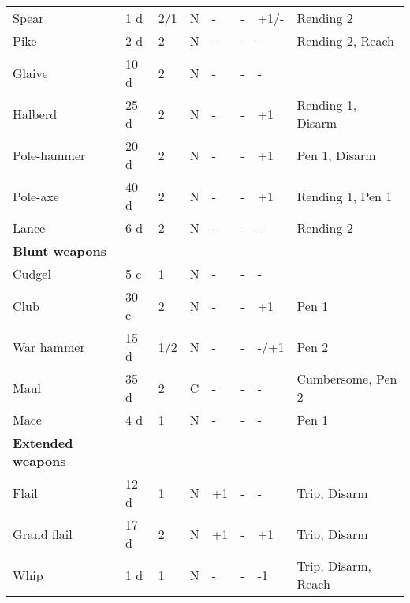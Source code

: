 \documentclass[a4paper,11pt,oneside]{book}
\newcommand{\textlf}[1]{\textbf{\titlecap{#1}}}
\begin{document}
\begin{table}[ht!]
\begin{tabular}{|l|l|l|l|l|l|l|l|}
		Spear & 1 d & 2/1 & N & - & - & +1/- & Rending 2 \\
		Pike & 2 d & 2 & N & - & - & - & Rending 2, Reach\\
		Glaive & 10 d & 2 & N & - & - & - & \textlf{damage edge+} \\
		Halberd & 25 d & 2 & N & - & - & +1 & Rending 1, Disarm\\
		Pole-hammer & 20 d & 2 & N & - & - & +1 & Pen 1, Disarm\\ 
		Pole-axe & 40 d & 2 & N & - & - & +1 & Rending 1, Pen 1 \\
		Lance & 6 d & 2 & N & - & - & - & Rending 2\\
		\hline
		\textbf{Blunt weapons} & & & & & & & \\
		\hline
		Cudgel & 5 c & 1  & N & - & - & - &  \\
		Club & 30 c & 2 & N & - & - & +1 & Pen 1 \\
		War hammer & 15 d & 1/2 & N & - & - & -/+1 & Pen 2 \\ 
		Maul & 35 d & 2 & C & - & - & - & Cumbersome, Pen 2 \\
		Mace & 4 d & 1 & N & - & - & - & Pen 1 \\
		\hline
		\textbf{Extended weapons} & & & & & & & \\
		\hline
		Flail & 12 d & 1 & N & +1 & - & - & Trip, Disarm \\ 
		Grand flail & 17 d & 2 & N & +1 & - & +1 & Trip, Disarm\\
		Whip & 1 d & 1 & N & - & - & -1 & Trip, Disarm, Reach\\
		\hline
	\end{tabular}
\end{table}
\end{document}
